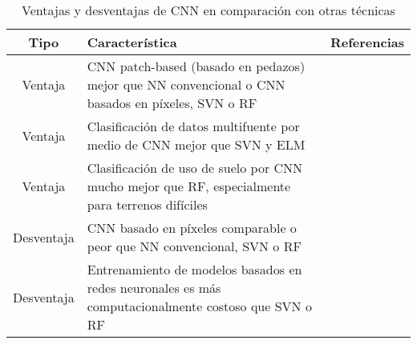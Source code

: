 \begin{center}
    \vspace{-\topsep}
    \begin{table}[h!]
        \begin{tabular}{ |c|m{11cm}|c| }
            \hline
            \bf Tipo & \bf Característica & \bf Referencias \\
            \hline
            Ventaja & CNN patch-based (basado en pedazos) mejor que NN convencional o CNN basados en píxeles, SVN o RF
                    & \autocite{sharma-2017} \\
            \hline
            Ventaja & Clasificación de datos multifuente por medio de CNN mejor que SVN y ELM & \autocite{xu-2017} \\
            \hline
            Ventaja & Clasificación de uso de suelo por CNN mucho mejor que RF, especialmente para terrenos difíciles &
            \autocite{rezaee-2018} \\
            \hline
            Desventaja & CNN basado en píxeles comparable o peor que NN convencional, SVN o RF & \autocite{sharma-2017}
            \\
            \hline
            Desventaja & Entrenamiento de modelos basados en redes neuronales es más computacionalmente costoso que SVN
            o RF & \autocite{sharma-2017,xu-2017,rezaee-2018} \\
            \hline
        \end{tabular}
        \caption{Ventajas y desventajas de CNN en comparación con otras técnicas}
        \label{table:2}
    \end{table}
    \vspace{-\topsep}
\end{center}

